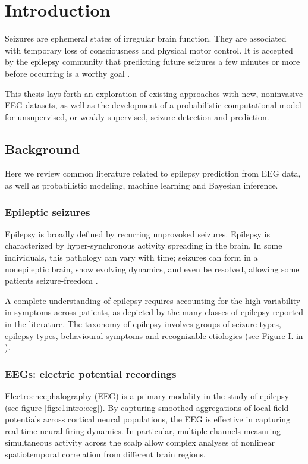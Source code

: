 
\chapter{Introduction}
\label{ch:1Introduction}

Seizures are ephemeral states of irregular brain function. They are associated with temporary loss of consciousness and physical motor control. It is accepted by the epilepsy community that predicting future seizures a few minutes or more before occurring is a worthy goal \cite{kelley2009ninds, dumanis2017seizure}.

This thesis lays forth an exploration of existing approaches with new, noninvasive EEG datasets, as well as the development of a probabilistic computational model for unsupervised, or weakly supervised, seizure detection and prediction.

\section{Background}
Here we review common literature related to epilepsy prediction from EEG data, as well as probabilistic modeling, machine learning and Bayesian inference.

\subsection{Epileptic seizures}
Epilepsy is broadly defined by recurring unprovoked seizures. Epilepsy is characterized by hyper-synchronous activity spreading in the brain. In some individuals, this pathology can vary with time; seizures can form in a nonepileptic brain, show evolving dynamics, and even be resolved, allowing some patients seizure-freedom \cite{kandel2000principles}.

A complete understanding of epilepsy requires accounting for the high variability in symptoms across patients, as depicted by the many classes of epilepsy reported in the literature. The taxonomy of epilepsy involves groups of seizure types, epilepsy types, behavioural symptoms and recognizable etiologies (see Figure I. in \cite{scheffer2017ilae}).

\subsection{EEGs: electric potential recordings}
Electroencephalography (EEG) is a primary modality in the study of epilepsy (see figure \ref{fig:c1intro:eeg}). By capturing smoothed aggregations of local-field-potentials across cortical neural populations, the EEG is effective in capturing real-time neural firing dynamics. In particular, multiple channels measuring simultaneous activity across the scalp allow complex analyses of nonlinear spatiotemporal correlation from different brain regions.

